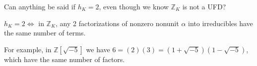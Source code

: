 \begin{remark}

Can anything be said if \(h_K = 2\), even though we know
\({\mathbb{Z}}_K\) is not a UFD?

\end{remark}

\begin{theorem}[Carlitz]

\(h_K = 2 \iff\) in \({\mathbb{Z}}_K\), any 2 factorizations of nonzero
nonunit \(\alpha\) into irreducibles have the same number of terms.

\end{theorem}

\begin{remark}

For example, in \({\mathbb{Z}}[ \sqrt{-5} ]\) we have
\(6 = (2)(3) = (1 + \sqrt{-5} )(1 - \sqrt{-5} )\), which have the same
number of factors.

\end{remark}

